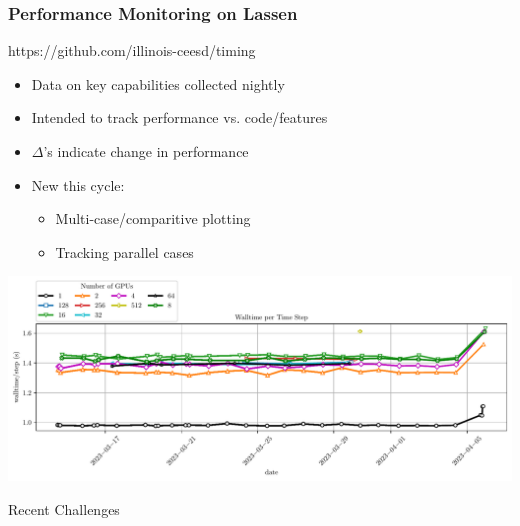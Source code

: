 \begin{frame}\frametitle{Performance Monitoring on Lassen}
\begin{minipage}[t][0.3\textheight][t]{\textwidth}
\begin{center}
https://github.com/illinois-ceesd/timing
\end{center}
\begin{multicols}{2}
\begin{itemize}
\item Data on key capabilities collected nightly
\item Intended to track performance vs. code/features
\item $\Delta$'s indicate change in performance
\columnbreak
\item New this cycle:
\begin{itemize}
\item Multi-case/comparitive plotting
\item Tracking parallel cases
\end{itemize}
\end{itemize}
\end{multicols}
\end{minipage}\vfill
\begin{center}
  \includegraphics[width=.8\textwidth]{Figures/mtc/y3-prediction-parallel-20230405.pdf}
\end{center}
\end{frame}

\begin{frame}
    \centering
    \Large
    Recent Challenges
\end{frame}

